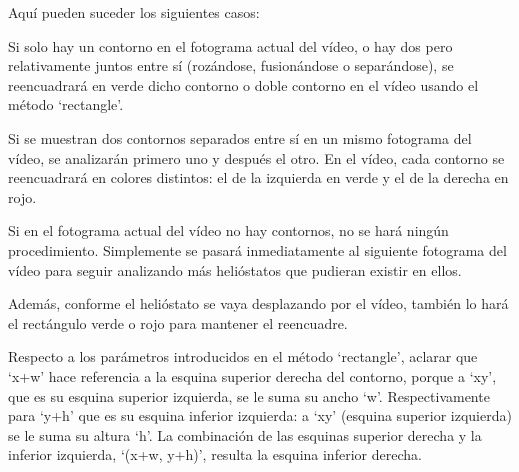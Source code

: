 Aquí pueden suceder los siguientes casos:

Si solo hay un contorno en el fotograma actual del vídeo, o hay dos pero relativamente juntos entre sí (rozándose, fusionándose o separándose), se reencuadrará en verde dicho contorno o doble contorno en el vídeo usando el método ‘rectangle’.

Si se muestran dos contornos separados entre sí en un mismo fotograma del vídeo, se analizarán primero uno y después el otro. En el vídeo, cada contorno se reencuadrará en colores distintos: el de la izquierda en verde y el de la derecha en rojo.

Si en el fotograma actual del vídeo no hay contornos, no se hará ningún procedimiento. Simplemente se pasará inmediatamente al siguiente fotograma del vídeo para seguir analizando más helióstatos que pudieran existir en ellos.

Además, conforme el helióstato se vaya desplazando por el vídeo, también lo hará el rectángulo verde o rojo para mantener el reencuadre.

Respecto a los parámetros introducidos en el método ‘rectangle’, aclarar que ‘x+w’ hace referencia a la esquina superior derecha del contorno, porque a ‘xy’, que es su esquina superior izquierda, se le suma su ancho ‘w’. Respectivamente para ‘y+h’ que es su esquina inferior izquierda: a ‘xy’ (esquina superior izquierda) se le suma su altura ‘h’. La combinación de las esquinas superior derecha y la inferior izquierda, ‘(x+w, y+h)’, resulta la esquina inferior derecha.\\[20pt]

